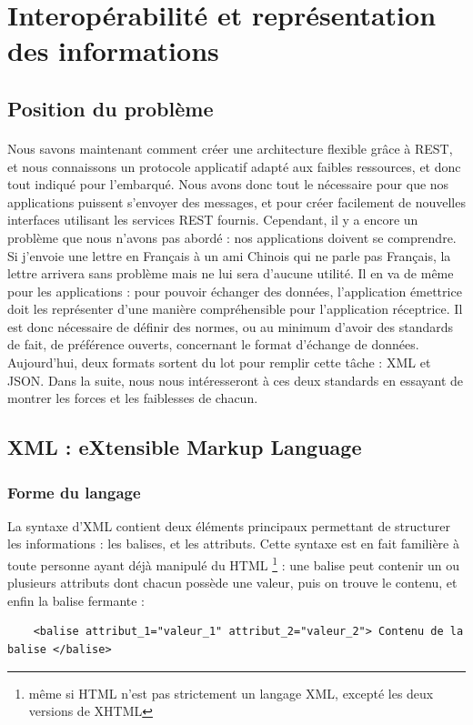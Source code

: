 \documentclass[a4paper,11pt]{article}
\begin{document}
\section{Interopérabilité et représentation des informations}


\subsection{Position du problème}


\paragraph*{}
Nous savons maintenant comment créer une architecture flexible grâce à REST, et nous connaissons un protocole applicatif adapté aux faibles ressources, et donc tout indiqué pour l'embarqué. Nous avons donc tout le nécessaire pour que nos applications puissent s'envoyer des messages, et pour créer facilement de nouvelles interfaces utilisant les services REST fournis.
Cependant, il y a encore un problème que nous n'avons pas abordé : nos applications doivent se comprendre. Si j'envoie une lettre en Français à un ami Chinois qui ne parle pas Français, la lettre arrivera sans problème mais ne lui sera d'aucune utilité. Il en va de même pour les applications : pour pouvoir échanger des données, l'application émettrice doit les représenter d'une manière compréhensible pour l'application réceptrice. Il est donc nécessaire de définir des normes, ou au minimum d'avoir des standards de fait, de préférence ouverts, concernant le format d'échange de données.\\
Aujourd'hui, deux formats sortent du lot pour remplir cette tâche : XML et JSON. Dans la suite, nous nous intéresseront à ces deux standards en essayant de montrer les forces et les faiblesses de chacun.



\subsection{XML : eXtensible Markup Language}

\subsubsection{Forme du langage}

La syntaxe d'XML contient deux éléments principaux permettant de structurer les informations : les balises, et les attributs. Cette syntaxe est en fait familière à toute personne ayant déjà manipulé du HTML \footnote{même si HTML n'est pas strictement un langage XML, excepté les deux versions de XHTML} : une balise peut contenir un ou plusieurs attributs dont chacun possède une valeur, puis on trouve le contenu, et enfin la balise fermante : 
\begin{verbatim}
	<balise attribut_1="valeur_1" attribut_2="valeur_2"> Contenu de la balise </balise>
\end{verbatim}
\end{document}
